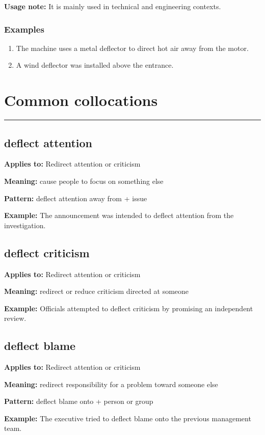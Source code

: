 \documentclass[11pt]{article}
\newcommand{\sectionrule}{\par\vspace{-0.5em}\noindent\textcolor{Accent}{\rule{\linewidth}{0.6pt}}\par}
\begin{document}
\textbf{Usage note:} It is mainly used in technical and engineering contexts.

\subsubsection{Examples}
\begin{enumerate}
  \item The machine uses a metal deflector to direct hot air away from the motor.
  \item A wind deflector was installed above the entrance.
\end{enumerate}

\section{Common collocations}
\sectionrule
\subsection{deflect attention}
\textbf{Applies to:} Redirect attention or criticism

\textbf{Meaning:} cause people to focus on something else

\textbf{Pattern:} deflect attention away from + issue

\textbf{Example:} The announcement was intended to deflect attention from the investigation.

\subsection{deflect criticism}
\textbf{Applies to:} Redirect attention or criticism

\textbf{Meaning:} redirect or reduce criticism directed at someone

\textbf{Example:} Officials attempted to deflect criticism by promising an independent review.

\subsection{deflect blame}
\textbf{Applies to:} Redirect attention or criticism

\textbf{Meaning:} redirect responsibility for a problem toward someone else

\textbf{Pattern:} deflect blame onto + person or group

\textbf{Example:} The executive tried to deflect blame onto the previous management team.
\end{document}
